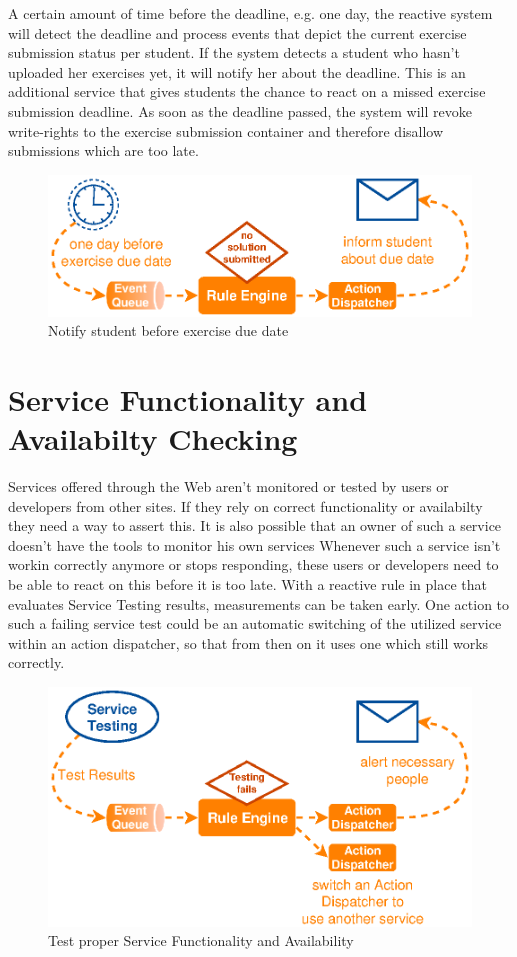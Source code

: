 A certain amount of time before the deadline, e.g. one day, the reactive system will detect the deadline and process events that depict the current exercise submission status per student.
If the system detects a student who hasn't uploaded her exercises yet, it will notify her about the deadline.
This is an additional service that gives students the chance to react on a missed exercise submission deadline.
As soon as the deadline passed, the system will revoke write-rights to the exercise submission container and therefore disallow submissions which are too late.
\begin{figure}[!ht]
  \centering
  \includegraphics{figures/ProBinderExerciseNotification}
  \caption{Notify student before exercise due date}
  \label{fig:ProBinderExerciseNotification}
\end{figure}

\section{Service Functionality and Availabilty Checking}
Services offered through the Web aren't monitored or tested by users or developers from other sites.
If they rely on correct functionality or availabilty they need a way to assert this.
It is also possible that an owner of such a service doesn't have the tools to monitor his own services
Whenever such a service isn't workin correctly anymore or stops responding, these users or developers need to be able to react on this before it is too late.
With a reactive rule in place that evaluates Service Testing results, measurements can be taken early.
One action to such a failing service test could be an automatic switching of the utilized service within an action dispatcher, so that from then on it uses one which still works correctly.
\begin{figure}[!ht]
  \centering
  \includegraphics{figures/ProBinderServiceTesting}
  \caption{Test proper Service Functionality and Availability}
  \label{fig:ProBinderServiceTesting}
\end{figure}

